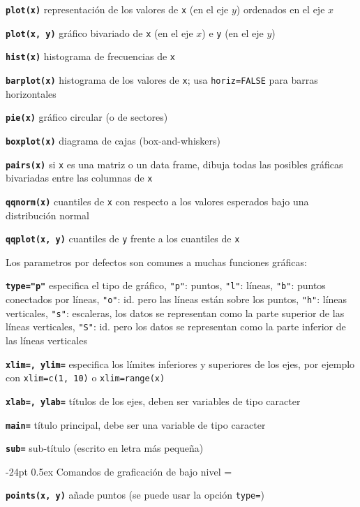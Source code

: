 \documentclass[10pt,landscape]{article}
\makeatletter
\renewcommand\section{\@startsection{section}{1}{0mm}%
                                     {-24pt}%
                                     {0.5ex}%
                                {\color[rgb]{1,0.54902,0}\normalfont\large\bfseries}}
\newcommand{\code}{\texttt}
\newcommand{\bcode}[1]{\texttt{\textbf{#1}}}
\makeatother
\begin{document}
\begin{multicols*}{3}
\bcode{plot(x)}  representación de los valores de \code{x} (en el eje $y$) ordenados en el eje $x$

\bcode{plot(x, y)}  gráfico bivariado de \code{x} (en el eje $x$) e \code{y} (en el eje $y$)

\bcode{hist(x)}  histograma de frecuencias de \code{x}

\bcode{barplot(x)}  histograma de los valores de \code{x}; usa
\code{horiz=FALSE} para barras horizontales

\bcode{pie(x)}  gráfico circular (o de sectores)

\bcode{boxplot(x)}  diagrama de cajas (box-and-whiskers)

\bcode{pairs(x)} si \code{x} es una matriz o un data frame, dibuja todas las posibles gráficas bivariadas entre las columnas de \code{x}

\bcode{qqnorm(x)} cuantiles de \code{x} con respecto a los valores esperados bajo una distribución normal

\bcode{qqplot(x, y)}  cuantiles de \code{y} frente a los cuantiles de \code{x}


Los parametros por defectos son comunes a muchas funciones gráficas:

\bcode{type="p"}  especifica el tipo de gráfico, \code{"p"}: puntos, \code{"l"}: líneas, \code{"b"}: puntos conectados por líneas, \code{"o"}: id. pero las líneas están sobre los puntos, \code{"h"}: líneas verticales, \code{"s"}: escaleras, los datos se representan como la parte superior de las líneas verticales, \code{"S"}: id. pero los datos se representan como la parte inferior de las líneas verticales

\bcode{xlim=, ylim=}  especifica los límites inferiores y superiores de los ejes, por ejemplo con \code{xlim=c(1, 10)} o \code{xlim=range(x)}

\bcode{xlab=, ylab=}  títulos de los ejes, deben ser variables de tipo caracter

\bcode{main=}  título principal, debe ser una variable de tipo caracter

\bcode{sub=}  sub-título (escrito en letra más pequeña)




\section{Comandos de graficación de bajo nivel}
\everypar={\hangindent=9mm}

\bcode{points(x, y)}  añade puntos (se puede usar la opción \code{type=})


\end{multicols*}
\end{document}
